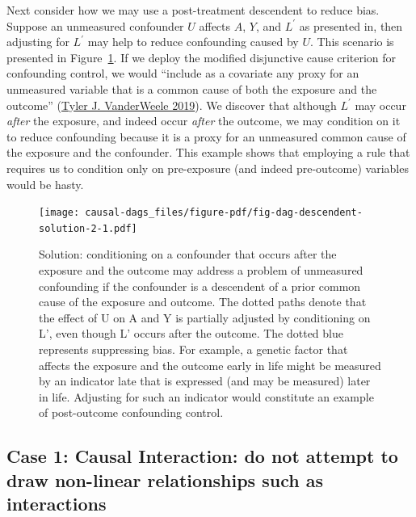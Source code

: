 \documentclass[
  singlecolumn]{report}
\begin{document}
Next consider how we may use a post-treatment descendent to reduce bias.
Suppose an unmeasured confounder \(U\) affects \(A\), \(Y\), and
\(L^\prime\) as presented in, then adjusting for \(L^\prime\) may help
to reduce confounding caused by \(U\). This scenario is presented in
Figure~\ref{fig-dag-descendent-solution-2}. If we deploy the modified
disjunctive cause criterion for confounding control, we would ``include
as a covariate any proxy for an unmeasured variable that is a common
cause of both the exposure and the outcome''
(\protect\hyperlink{ref-vanderweele2019}{Tyler J. VanderWeele 2019}). We
discover that although \(L^\prime\) may occur \emph{after} the exposure,
and indeed occur \emph{after} the outcome, we may condition on it to
reduce confounding because it is a proxy for an unmeasured common cause
of the exposure and the confounder. This example shows that employing a
rule that requires us to condition only on pre-exposure (and indeed
pre-outcome) variables would be hasty.

\begin{figure}

{\centering \texttt{[image: causal-dags\_files/figure-pdf/fig-dag-descendent-solution-2-1.pdf]}

}

\caption{\label{fig-dag-descendent-solution-2}Solution: conditioning on
a confounder that occurs after the exposure and the outcome may address
a problem of unmeasured confounding if the confounder is a descendent of
a prior common cause of the exposure and outcome. The dotted paths
denote that the effect of U on A and Y is partially adjusted by
conditioning on L', even though L' occurs after the outcome. The dotted
blue represents suppressing bias. For example, a genetic factor that
affects the exposure and the outcome early in life might be measured by
an indicator late that is expressed (and may be measured) later in life.
Adjusting for such an indicator would constitute an example of
post-outcome confounding control.}

\end{figure}

\hypertarget{case-1-causal-interaction-do-not-attempt-to-draw-non-linear-relationships-such-as-interactions}{%
\subsection{Case 1: Causal Interaction: do not attempt to draw
non-linear relationships such as
interactions}\label{case-1-causal-interaction-do-not-attempt-to-draw-non-linear-relationships-such-as-interactions}}
\end{document}
